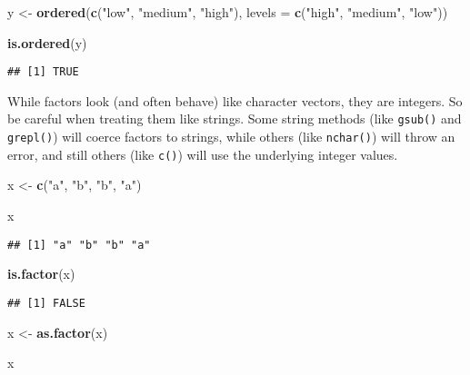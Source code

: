 \documentclass[
]{book}
\newenvironment{Shaded}{\begin{snugshade}}{\end{snugshade}}
\newcommand{\DataTypeTok}[1]{\textcolor[rgb]{0.13,0.29,0.53}{#1}}
\newcommand{\KeywordTok}[1]{\textcolor[rgb]{0.13,0.29,0.53}{\textbf{#1}}}
\newcommand{\NormalTok}[1]{#1}
\newcommand{\StringTok}[1]{\textcolor[rgb]{0.31,0.60,0.02}{#1}}
\begin{document}
\begin{Shaded}
\begin{Highlighting}[]
\NormalTok{y \textless{}{-}}\StringTok{ }\KeywordTok{ordered}\NormalTok{(}\KeywordTok{c}\NormalTok{(}\StringTok{"low"}\NormalTok{, }\StringTok{"medium"}\NormalTok{, }\StringTok{"high"}\NormalTok{), }\DataTypeTok{levels =} \KeywordTok{c}\NormalTok{(}\StringTok{"high"}\NormalTok{, }\StringTok{"medium"}\NormalTok{, }\StringTok{"low"}\NormalTok{))}

\KeywordTok{is.ordered}\NormalTok{(y)}
\end{Highlighting}
\end{Shaded}

\begin{verbatim}
## [1] TRUE
\end{verbatim}

While factors look (and often behave) like character vectors, they are integers. So be careful when treating them like strings. Some string methods (like \texttt{gsub()} and \texttt{grepl()}) will coerce factors to strings, while others (like \texttt{nchar()}) will throw an error, and still others (like \texttt{c()}) will use the underlying integer values.

\begin{Shaded}
\begin{Highlighting}[]
\NormalTok{x \textless{}{-}}\StringTok{ }\KeywordTok{c}\NormalTok{(}\StringTok{"a"}\NormalTok{, }\StringTok{"b"}\NormalTok{, }\StringTok{"b"}\NormalTok{, }\StringTok{"a"}\NormalTok{)}

\NormalTok{x}
\end{Highlighting}
\end{Shaded}

\begin{verbatim}
## [1] "a" "b" "b" "a"
\end{verbatim}

\begin{Shaded}
\begin{Highlighting}[]
\KeywordTok{is.factor}\NormalTok{(x)}
\end{Highlighting}
\end{Shaded}

\begin{verbatim}
## [1] FALSE
\end{verbatim}

\begin{Shaded}
\begin{Highlighting}[]
\NormalTok{x \textless{}{-}}\StringTok{ }\KeywordTok{as.factor}\NormalTok{(x)}

\NormalTok{x}
\end{Highlighting}
\end{Shaded}
\end{document}
